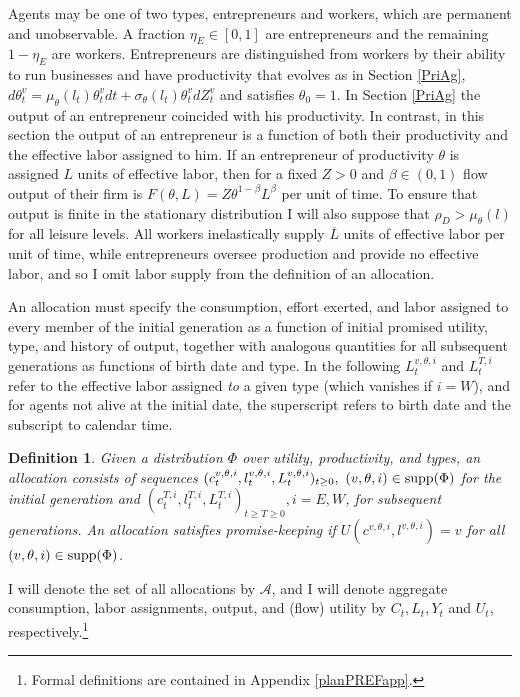\documentclass[11pt]{article}
\theoremstyle{plain}
\newtheorem{defn}{Definition}[section]
\begin{document}
Agents may be one of two types, entrepreneurs and workers, which are permanent and unobservable. A fraction $\eta_E \in [0,1]$ are entrepreneurs and the remaining $1-\eta_E$ are workers. Entrepreneurs are distinguished from workers by their ability to run businesses and have productivity that evolves as in Section \ref{PriAg}, $d\theta^v_t = \mu_{\theta}(l_t)\theta^v_tdt + \sigma_{\theta}(l_t)\theta^v_t dZ^v_t$ and satisfies $\theta_0 = 1$. In Section \ref{PriAg} the output of an entrepreneur coincided with his productivity. In contrast, in this section the output of an entrepreneur is a function of both their productivity and the effective labor assigned to him. If an entrepreneur of productivity $\theta$ is assigned $L$ units of effective labor, then for a fixed $Z>0$ and $\beta \in (0,1)$ flow output of their firm is $F(\theta,L) = Z\theta^{1-\beta}L^{\beta}$ per unit of time. To ensure that output is finite in the stationary distribution I will also suppose that $\rho_D > \mu_{\theta}(l)$ for all leisure levels. All workers inelastically supply $\overline{L}$ units of effective labor per unit of time, while entrepreneurs oversee production and provide no effective labor, and so I omit labor supply from the definition of an allocation. 


An allocation must specify the consumption, effort exerted, and labor assigned to every member of the initial generation as a function of initial promised utility, type, and history of output, together with analogous quantities for all subsequent generations as functions of birth date and type. In the following $L^{v,\theta,i}_t$ and $L^{T,i}_t$ refer to the effective labor assigned \textit{to} a given type (which vanishes if $i=W$), and for agents not alive at the initial date, the superscript refers to birth date and the subscript to calendar time.

\begin{defn} \label{defnALLOC}
Given a distribution $\Phi$ over utility, productivity, and types, an allocation consists of sequences $(c^{v,\theta,i}_t,l^{v,\theta,i}_t,L^{v,\theta,i}_t)_{t\geq 0}, \ (v,\theta,i) \in \textnormal{supp}(\Phi)$ for the initial generation and $(c^{T,i}_t, l^{T,i}_t,L^{T,i}_t)_{t\geq T \geq 0}, i = E,W$, for subsequent generations. An allocation satisfies promise-keeping if $U(c^{v,\theta,i},l^{v,\theta,i})= v$ for all $(v,\theta,i) \in \textnormal{supp}(\Phi)$.

\end{defn}
I will denote the set of all allocations by $\mathcal{A}$, and I will denote aggregate consumption, labor assignments, output, and (flow) utility by $C_t, L_t, Y_t$ and $U_t$, respectively.\footnote{Formal definitions are contained in Appendix \ref{planPREFapp}.} 
\end{document}

